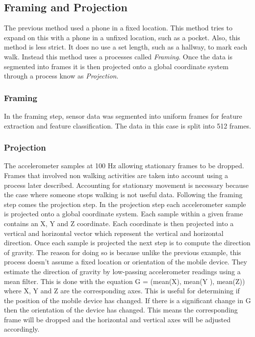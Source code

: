 \documentclass{sig-alternate}
\begin{document}
\subsection{Framing and Projection}
	The previous method used a phone in a fixed location. This method tries to expand on this with a phone in a unfixed location, such as a pocket. Also, this method is less strict. It does no use a set length, such as a hallway, to mark each walk. Instead this method uses a processes called \textit{Framing}. Once the data is segmented into frames it is then projected onto a global coordinate system through a process know as \textit{Projection}.
\subsubsection{Framing}
 In the framing step, sensor data was segmented into uniform frames for feature extraction and feature classification. The data in this case is split into 512 frames.
\subsubsection{Projection}
The accelerometer samples at 100 Hz allowing stationary frames to be dropped. Frames that involved non walking activities are taken into account using a process later described. Accounting for stationary movement is necessary because the case where someone stops walking is not useful data. Following the framing step comes the projection step. In the projection step each accelerometer sample is projected onto a global coordinate system. Each sample within a given frame contains an X, Y and Z coordinate. Each coordinate is then projected into a vertical and horizontal vector which represent the vertical and horizontal direction. Once each sample is projected the next step is to compute the direction of gravity. The reason for doing so is because unlike the previous example, this process doesn't assume a fixed location or orientation of the mobile device. They estimate the direction of gravity by low-passing accelerometer readings using a mean filter. This is done with the equation G = (mean(X), mean(Y ), mean(Z)) where X, Y and Z are the corresponding axes. This is useful for determining if the position of the mobile device has changed. If there is a significant change in G then the orientation of the device has changed. This means the corresponding frame will be dropped and the horizontal and vertical axes will be adjusted accordingly. 
\end{document}
